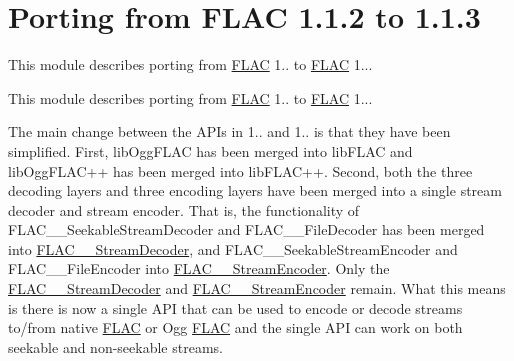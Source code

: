 \hypertarget{group__porting__1__1__2__to__1__1__3}{}\section{Porting from F\+L\+AC 1.1.2 to 1.1.3}
\label{group__porting__1__1__2__to__1__1__3}


This module describes porting from \hyperlink{namespace_f_l_a_c}{F\+L\+AC} 1.. to \hyperlink{namespace_f_l_a_c}{F\+L\+AC} 1...  


This module describes porting from \hyperlink{namespace_f_l_a_c}{F\+L\+AC} 1.. to \hyperlink{namespace_f_l_a_c}{F\+L\+AC} 1... 

The main change between the A\+P\+Is in 1.. and 1.. is that they have been simplified. First, lib\+Ogg\+F\+L\+AC has been merged into lib\+F\+L\+AC and lib\+Ogg\+F\+L\+A\+C++ has been merged into lib\+F\+L\+A\+C++. Second, both the three decoding layers and three encoding layers have been merged into a single stream decoder and stream encoder. That is, the functionality of F\+L\+A\+C\+\_\+\+\_\+\+Seekable\+Stream\+Decoder and F\+L\+A\+C\+\_\+\+\_\+\+File\+Decoder has been merged into \hyperlink{struct_f_l_a_c_____stream_decoder}{F\+L\+A\+C\+\_\+\+\_\+\+Stream\+Decoder}, and F\+L\+A\+C\+\_\+\+\_\+\+Seekable\+Stream\+Encoder and F\+L\+A\+C\+\_\+\+\_\+\+File\+Encoder into \hyperlink{struct_f_l_a_c_____stream_encoder}{F\+L\+A\+C\+\_\+\+\_\+\+Stream\+Encoder}. Only the \hyperlink{struct_f_l_a_c_____stream_decoder}{F\+L\+A\+C\+\_\+\+\_\+\+Stream\+Decoder} and \hyperlink{struct_f_l_a_c_____stream_encoder}{F\+L\+A\+C\+\_\+\+\_\+\+Stream\+Encoder} remain. What this means is there is now a single A\+PI that can be used to encode or decode streams to/from native \hyperlink{namespace_f_l_a_c}{F\+L\+AC} or Ogg \hyperlink{namespace_f_l_a_c}{F\+L\+AC} and the single A\+PI can work on both seekable and non-\/seekable streams.

